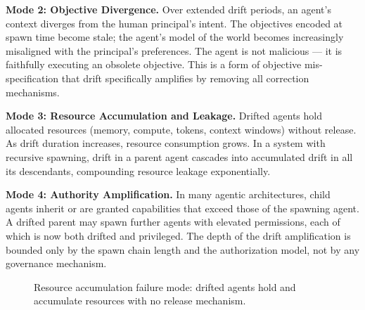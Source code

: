 \textbf{Mode 2: Objective Divergence.} Over extended drift periods, an agent's context diverges from the human principal's intent. The objectives encoded at spawn time become stale; the agent's model of the world becomes increasingly misaligned with the principal's preferences. The agent is not malicious — it is faithfully executing an obsolete objective. This is a form of objective mis-specification that drift specifically amplifies by removing all correction mechanisms.

\textbf{Mode 3: Resource Accumulation and Leakage.} Drifted agents hold allocated resources (memory, compute, tokens, context windows) without release. As drift duration increases, resource consumption grows. In a system with recursive spawning, drift in a parent agent cascades into accumulated drift in all its descendants, compounding resource leakage exponentially.

\textbf{Mode 4: Authority Amplification.} In many agentic architectures, child agents inherit or are granted capabilities that exceed those of the spawning agent. A drifted parent may spawn further agents with elevated permissions, each of which is now both drifted and privileged. The depth of the drift amplification is bounded only by the spawn chain length and the authorization model, not by any governance mechanism.

\begin{figure}[tb]
\centering
\scriptsize
{}
\caption{Resource accumulation failure mode: drifted agents hold and accumulate resources with no release mechanism.}
\label{fig:resource_leakage}
\end{figure}

